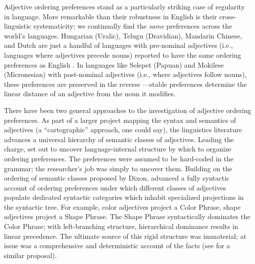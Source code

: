 \documentclass[12pt]{article}
\begin{document}
Adjective ordering preferences stand as a particularly striking case of regularity in language. More remarkable than their robustness in English is their cross-linguistic systematicity: we continually find the \emph{same} preferences across the world's languages. Hungarian (Uralic), Telugu (Dravidian), Mandarin Chinese, and Dutch are just a handful of languages with pre-nominal adjectives (i.e., languages where adjectives precede nouns) reported to have the same ordering preferences as English \citep{Martin1969a,hetzron1978,dixon1982,Sproat1991,LaPolla2004}.  In languages like Selepet (Papuan) and Mokilese (Micronesian) with post-nominal adjectives (i.e., where adjectives follow nouns), these preferences are preserved in the reverse \citep{hetzron1978,dixon1982,Sproat1991}---stable preferences determine the linear distance of an adjective from the noun it modifies.

There have been two general approaches to the investigation of adjective ordering preferences. 
As part of a larger project mapping the syntax and semantics of adjectives (a ``cartographic'' approach, one could say), the linguistics literature advances a universal hierarchy of semantic classes of adjectives. Leading the charge, \citet{dixon1982} set out to uncover language-internal structure by which to organize ordering preferences. The preferences were assumed to be hard-coded in the grammar; the researcher's job was simply to uncover them. 
Building on the ordering of semantic classes proposed by Dixon, \cite{Cinque1994} advanced a fully syntactic account of ordering preferences under which different classes of adjectives populate dedicated syntactic categories which inhabit specialized projections in the syntactic tree. For example, color adjectives project a Color Phrase, shape adjectives project a Shape Phrase. The Shape Phrase syntactically dominates the Color Phrase; with left-branching structure, hierarchical dominance results in linear precedence. The ultimate source of this rigid structure was immaterial; at issue was a comprehensive and deterministic account of the facts (see \citealp{scott2002} for a similar proposal). 
\end{document}
